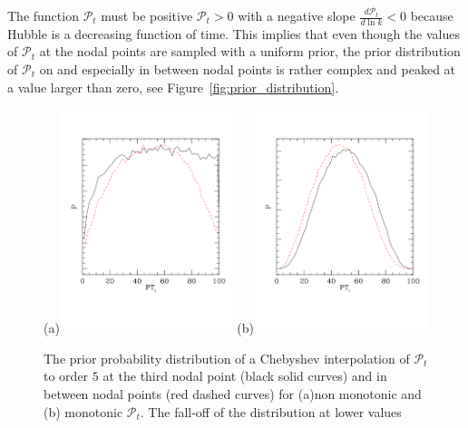 \documentclass[a4paper,11pt]{article}
\newcommand{\ptensor}{{\mathcal{P}_t}}
\begin{document}
The function $\ptensor$ must be positive $\ptensor>0$ with a negative
slope $\frac{d \ptensor}{d\ln k}<0$ because Hubble is a decreasing
function of time. This implies that even though the values of
$\ptensor$ at the nodal points are sampled with a uniform prior, the
prior distribution of $\ptensor$ on and especially in between nodal
points is rather complex and peaked at a value larger than zero, see
Figure~\ref{fig:prior_distribution}.
\begin{figure}
  (a)\includegraphics[width=0.45\textwidth]{PR5_PG5_non_monotonic_PG_prior}
  (b)\includegraphics[width=0.45\textwidth]{PR5_PG5_PG_prior}
  \caption[Prior distribution for monotonic and non-monotonic tensor
    power spectra]{The prior probability distribution of a Chebyshev
    interpolation of $\ptensor$ to order $5$ at the third nodal
    point (black solid curves) and in between nodal points (red dashed
    curves) for (a)non monotonic and (b) monotonic
    $\ptensor$. The fall-off of the distribution at lower values
}
\end{figure}
\end{document}
